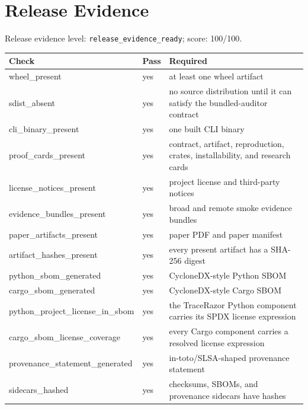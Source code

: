 \section{Release Evidence}
Release evidence level: \texttt{release\_evidence\_ready}; score: 100/100.

\begin{tabular}{lll}
Check & Pass & Required \\
\hline
wheel\_present & yes & at least one wheel artifact \\
sdist\_absent & yes & no source distribution until it can satisfy the bundled-auditor contract \\
cli\_binary\_present & yes & one built CLI binary \\
proof\_cards\_present & yes & contract, artifact, reproduction, crates, installability, and research cards \\
license\_notices\_present & yes & project license and third-party notices \\
evidence\_bundles\_present & yes & broad and remote smoke evidence bundles \\
paper\_artifacts\_present & yes & paper PDF and paper manifest \\
artifact\_hashes\_present & yes & every present artifact has a SHA-256 digest \\
python\_sbom\_generated & yes & CycloneDX-style Python SBOM \\
cargo\_sbom\_generated & yes & CycloneDX-style Cargo SBOM \\
python\_project\_license\_in\_sbom & yes & the TraceRazor Python component carries its SPDX license expression \\
cargo\_sbom\_license\_coverage & yes & every Cargo component carries a resolved license expression \\
provenance\_statement\_generated & yes & in-toto/SLSA-shaped provenance statement \\
sidecars\_hashed & yes & checksums, SBOMs, and provenance sidecars have hashes \\
\end{tabular}
